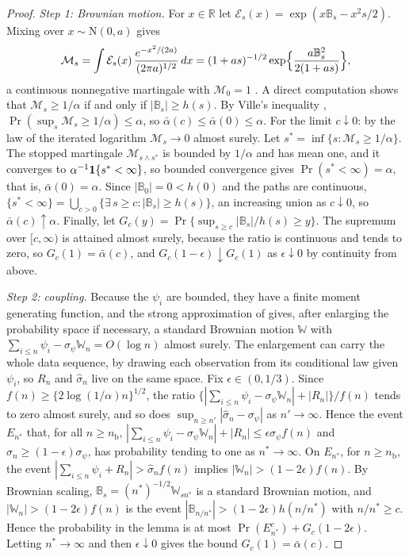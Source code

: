 \begin{proof}
\emph{Step 1: Brownian motion.} For $x\in\mathbb R$ let $\mathcal E_s(x)=\exp(x\mathbb B_s-x^2s/2)$. Mixing over $x\sim\mathrm N(0,a)$ gives
\[
  \mathcal M_s=\int\mathcal E_s(x)\,\frac{e^{-x^2/(2a)}}{(2\pi a)^{1/2}}\,dx=(1+as)^{-1/2}\exp\Bigl\{\frac{a\mathbb B_s^2}{2(1+as)}\Bigr\},
\]
a continuous nonnegative martingale with $\mathcal M_0=1$ \citep{robbins1970}. A direct computation shows that $\mathcal M_s\ge1/\alpha$ if and only if $|\mathbb B_s|\ge h(s)$. By Ville's inequality \citep{ville1939}, $\Pr(\sup_s\mathcal M_s\ge1/\alpha)\le\alpha$, so $\bar\alpha(c)\le\bar\alpha(0)\le\alpha$. For the limit $c\downarrow0$: by the law of the iterated logarithm $\mathcal M_s\to0$ almost surely. Let $s^\ast=\inf\{s:\mathcal M_s\ge1/\alpha\}$. The stopped martingale $\mathcal M_{s\wedge s^\ast}$ is bounded by $1/\alpha$ and has mean one, and it converges to $\alpha^{-1}\mathbf{1}\!\left\{s^\ast<\infty\right\}$, so bounded convergence gives $\Pr(s^\ast<\infty)=\alpha$, that is, $\bar\alpha(0)=\alpha$. Since $|\mathbb B_0|=0<h(0)$ and the paths are continuous, $\{s^\ast<\infty\}=\bigcup_{c>0}\{\exists\,s\ge c:|\mathbb B_s|\ge h(s)\}$, an increasing union as $c\downarrow0$, so $\bar\alpha(c)\uparrow\alpha$. Finally, let $G_c(y)=\Pr\{\sup_{s\ge c}|\mathbb B_s|/h(s)\ge y\}$. The supremum over $[c,\infty)$ is attained almost surely, because the ratio is continuous and tends to zero, so $G_c(1)=\bar\alpha(c)$, and $G_c(1-\epsilon)\downarrow G_c(1)$ as $\epsilon\downarrow0$ by continuity from above.

\emph{Step 2: coupling.} Because the $\psi_i$ are bounded, they have a finite moment generating function, and the strong approximation of \citet{komlos1975,komlos1976} gives, after enlarging the probability space if necessary, a standard Brownian motion $\mathbb W$ with $\sum_{i\le n}\psi_i-\sigma_\psi\mathbb W_n=O(\log n)$ almost surely. The enlargement can carry the whole data sequence, by drawing each observation from its conditional law given $\psi_i$, so $R_n$ and $\widehat\sigma_n$ live on the same space. Fix $\epsilon\in(0,1/3)$. Since $f(n)\ge\{2\log(1/\alpha)n\}^{1/2}$, the ratio $\{|\sum_{i\le n}\psi_i-\sigma_\psi\mathbb W_n|+|R_n|\}/f(n)$ tends to zero almost surely, and so does $\sup_{n\ge n'}|\widehat\sigma_n-\sigma_\psi|$ as $n'\to\infty$. Hence the event $E_{n^\ast}$ that, for all $n\ge n_{\mathrm b}$, $|\sum_{i\le n}\psi_i-\sigma_\psi\mathbb W_n|+|R_n|\le\epsilon\sigma_\psi f(n)$ and $\widehat\sigma_n\ge(1-\epsilon)\sigma_\psi$, has probability tending to one as $n^\ast\to\infty$. On $E_{n^\ast}$, for $n\ge n_{\mathrm b}$, the event $|\sum_{i\le n}\psi_i+R_n|>\widehat\sigma_nf(n)$ implies $|\mathbb W_n|>(1-2\epsilon)f(n)$. By Brownian scaling, $\mathbb B_s=(n^\ast)^{-1/2}\mathbb W_{sn^\ast}$ is a standard Brownian motion, and $|\mathbb W_n|>(1-2\epsilon)f(n)$ is the event $|\mathbb B_{n/n^\ast}|>(1-2\epsilon)h(n/n^\ast)$ with $n/n^\ast\ge c$. Hence the probability in the lemma is at most $\Pr(E_{n^\ast}^c)+G_c(1-2\epsilon)$. Letting $n^\ast\to\infty$ and then $\epsilon\downarrow0$ gives the bound $G_c(1)=\bar\alpha(c)$.
\end{proof}

